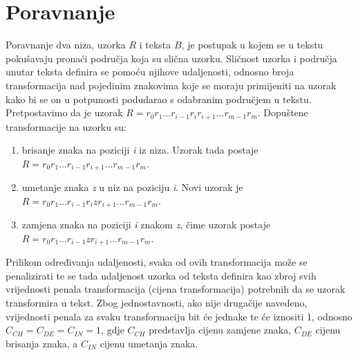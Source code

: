 \documentclass[times, utf8, zavrsni]{fer}
\begin{document}
\section{Poravnanje}
\begin{sloppypar}
Poravnanje dva niza, uzorka $R$ i teksta $B$, je postupak u kojem se u tekstu pokušavaju pronaći područja koja su slična uzorku. Sličnost uzorka i područja unutar teksta definira se pomoću njihove udaljenosti, odnosno broja transformacija nad pojedinim znakovima koje se moraju primijeniti na uzorak kako bi se on u potpunosti podudarao s odabranim područjem u tekstu. Pretpostavimo da je uzorak \(R = r_{0}r_{1}...r_{i-1}r_{i}r_{i+1}...r_{m-1}r_{m}\). Dopuštene transformacije na uzorku su:
\begin{enumerate}
\item brisanje znaka na poziciji \textit{i} iz niza. Uzorak tada postaje \(R = r_{0}r_{1}...r_{i-1}r_{i+1}...r_{m-1}r_{m}\).
\item umetanje znaka \textit{z} u niz na poziciju \textit{i}. Novi uzorak je \(R = r_{0}r_{1}...r_{i-1}r_{i}zr_{i+1}...r_{m-1}r_{m}\).
\item zamjena znaka na poziciji \textit{i} znakom \textit{z}, čime uzorak postaje \(R = r_{0}r_{1}...r_{i-1}zr_{i+1}...r_{m-1}r_{m}\).
\end{enumerate}
\end{sloppypar}
Prilikom određivanja udaljenosti, svaka od ovih transformacija može se penalizirati te se tada udaljenost uzorka od teksta definira kao zbroj svih vrijednosti penala transformacija (cijena transformacija) potrebnih da se uzorak transformira u tekst. Zbog jednostavnosti, ako nije drugačije navedeno, vrijednosti penala za svaku transformaciju bit će jednake te će iznositi 1, odnosno $C_{CH} = C_{DE} = C_{IN} = 1$, gdje $C_{CH}$ predstavlja cijenu zamjene znaka, $C_{DE}$ cijenu brisanja znaka, a $C_{IN}$ cijenu umetanja znaka.
\end{document}
